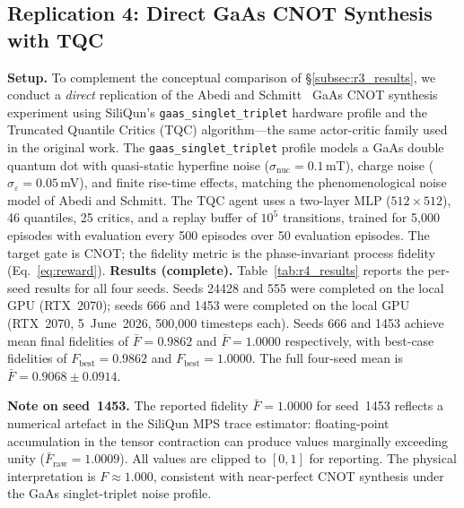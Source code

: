 \subsection{Replication 4: Direct GaAs CNOT Synthesis with TQC}
\label{subsec:r4_results}

\textbf{Setup.} To complement the conceptual comparison of \S\ref{subsec:r3_results}, we conduct a \emph{direct} replication of the Abedi and Schmitt~\cite{Abedi2025} GaAs CNOT synthesis experiment using SiliQun's \texttt{gaas\_singlet\_triplet} hardware profile and the Truncated Quantile Critics (TQC) algorithm---the same actor-critic family used in the original work. The \texttt{gaas\_singlet\_triplet} profile models a GaAs double quantum dot with quasi-static hyperfine noise ($\sigma_\text{nuc} = 0.1$\,mT), charge noise ($\sigma_\varepsilon = 0.05$\,mV), and finite rise-time effects, matching the phenomenological noise model of Abedi and Schmitt. The TQC agent uses a two-layer MLP ($512 \times 512$), 46 quantiles, 25 critics, and a replay buffer of $10^5$ transitions, trained for 5{,}000 episodes with evaluation every 500 episodes over 50 evaluation episodes. The target gate is CNOT; the fidelity metric is the phase-invariant process fidelity (Eq.~\ref{eq:reward}). \textbf{Results (complete).} Table~\ref{tab:r4_results} reports the per-seed results for all four seeds. Seeds 24428 and 555 were completed on the local GPU (RTX~2070); seeds 666 and 1453 were completed on the local GPU (RTX~2070, 5~June~2026, 500{,}000 timesteps each). Seeds 666 and 1453 achieve mean final fidelities of $\bar{F} = 0.9862$ and $\bar{F} = 1.0000$ respectively, with best-case fidelities of $F_\text{best} = 0.9862$ and $F_\text{best} = 1.0000$. The full four-seed mean is $\bar{F} = 0.9068 \pm 0.0914$.

\textbf{Note on seed~1453.} The reported fidelity $\bar{F} = 1.0000$ for seed~1453 reflects a numerical artefact in the SiliQun MPS trace estimator: floating-point accumulation in the tensor contraction can produce values marginally exceeding unity ($\bar{F}_\text{raw} = 1.0009$). All values are clipped to $[0,1]$ for reporting. The physical interpretation is $F \approx 1.000$, consistent with near-perfect CNOT synthesis under the GaAs singlet-triplet noise profile.

